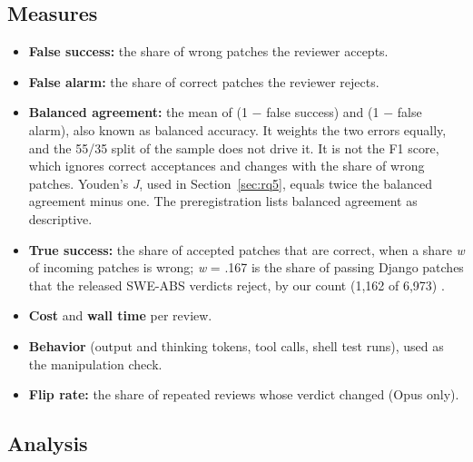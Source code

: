 \documentclass[sigconf,nonacm]{acmart}
\begin{document}
\subsection{Measures}\label{sec:measures}

\begin{itemize}
\item \textbf{False success:} the share of wrong patches the reviewer accepts.
\item \textbf{False alarm:} the share of correct patches the reviewer rejects.
\item \textbf{Balanced agreement:} the mean of (1 $-$ false success) and (1 $-$ false alarm), also known as balanced accuracy. It weights the two errors equally, and the 55/35 split of the sample does not drive it. It is not the F1 score, which ignores correct acceptances and changes with the share of wrong patches. Youden's \textit{J}, used in Section~\ref{sec:rq5}, equals twice the balanced agreement minus one. The preregistration lists balanced agreement as descriptive.
\item \textbf{True success:} the share of accepted patches that are correct, when a share \textit{w} of incoming patches is wrong; \textit{w} = .167 is the share of passing Django patches that the released SWE-ABS verdicts reject, by our count (1,162 of 6,973) \cite{openagenteval2026sweabs}.
\item \textbf{Cost} and \textbf{wall time} per review.
\item \textbf{Behavior} (output and thinking tokens, tool calls, shell test runs), used as the manipulation check.
\item \textbf{Flip rate:} the share of repeated reviews whose verdict changed (Opus only).
\end{itemize}

\subsection{Analysis}\label{sec:analysis}
\end{document}
